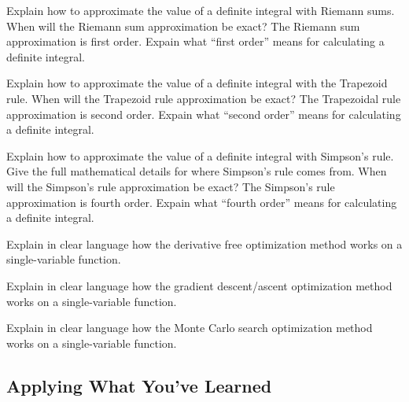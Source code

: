 \begin{problem}
    Explain how to approximate the value of a definite integral with Riemann sums.  When
    will the Riemann sum approximation be exact?  The Riemann sum approximation is first
    order.  Expain what ``first order'' means for calculating a definite integral. 
\end{problem}

\begin{problem}
    Explain how to approximate the value of a definite integral with the Trapezoid rule.
    When will the Trapezoid rule approximation be exact?  The Trapezoidal rule
    approximation is second
    order.  Expain what ``second order'' means for calculating a definite integral. 
\end{problem}

\begin{problem}
    Explain how to approximate the value of a definite integral with Simpson's rule.  Give
    the full mathematical details for where Simpson's rule comes from.  When will the
    Simpson's rule approximation be exact?  The Simpson's rule approximation is fourth
    order.  Expain what ``fourth order'' means for calculating a definite integral. 
\end{problem}

\begin{problem}
    Explain in clear language how the derivative free optimization method works on a
    single-variable function.
\end{problem}

\begin{problem}
    Explain in clear language how the gradient descent/ascent optimization method works on a
    single-variable function.
\end{problem}

\begin{problem}
    Explain in clear language how the Monte Carlo search optimization method works on a
    single-variable function.
\end{problem}

\subsection{Applying What You've Learned}

